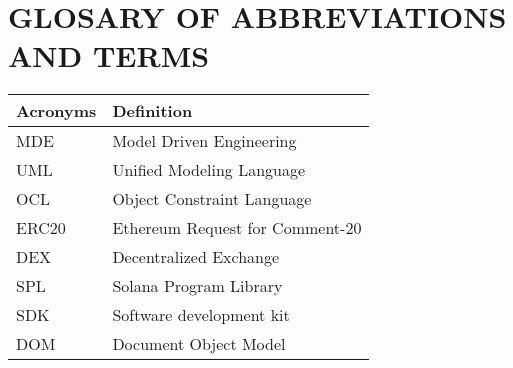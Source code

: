 \chapter*{GLOSARY OF ABBREVIATIONS AND TERMS}

\begin{longtable}{|>{\raggedright\arraybackslash}p{4cm}|>{\raggedright\arraybackslash}p{10cm}|}
  \hline
  \textbf{Acronyms}       & \textbf{Definition}           
  \\
  \hline
  MDE                    & Model Driven Engineering  
  \\
  \hline
  UML                    & Unified Modeling Language    
  \\
  \hline
  OCL                    & Object Constraint Language
  \\
  \hline
  ERC20                  & Ethereum Request for Comment-20 
  \\
  \hline
  DEX                    & Decentralized Exchange
  \\
  \hline
  SPL                    & Solana Program Library                
  \\
  \hline
  SDK                    & Software development kit
  \\
  \hline
  DOM                    & Document Object Model 
  \\
  \hline
\end{longtable}